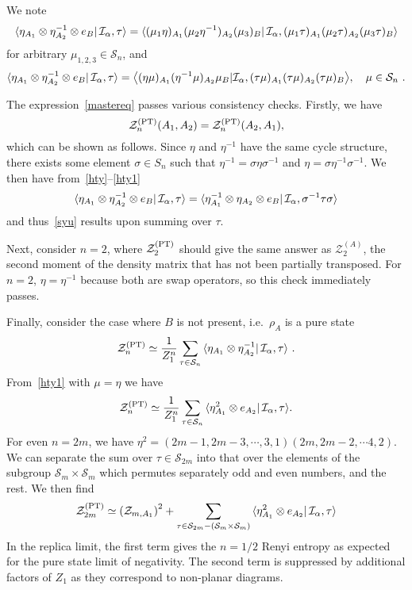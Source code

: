 \documentclass[a4paper,11pt]{article}
\newcommand\vev[1]{{\ensuremath{\left\langle{#1}\right\rangle}}}
\newcommand{\be}{\begin{equation}}
\newcommand{\ee}{\end{equation}}
\newcommand\al{{\alpha}}
\newcommand\sig{\sigma}
\newcommand\sI{{\ensuremath{{\mathcal I}}}}
\newcommand\sS{{\mathcal S}}
\begin{document}
We note 
\be \label{hty}
\bra{\eta_{A_1} \otimes \eta^{-1}_{A_2} \otimes e_{B}}\mathcal{I}_{\alpha},\tau\rangle
= \bra{(\mu_1 \eta)_{A_1} (\mu_2 \eta^{-1})_{A_2} (\mu_3)_{B}}\mathcal{I}_{\alpha},(\mu_1\tau)_{A_1} 
(\mu_2\tau)_{A_2} (\mu_3\tau)_{B} \rangle
\ee
for arbitrary $\mu_{1,2,3} \in \sS_n$, and 
\be \label{hty1}
\bra{\eta_{A_1} \otimes \eta^{-1}_{A_2} \otimes e_{B}}\mathcal{I}_{\alpha},\tau\rangle =
 \vev{(\eta \mu)_{A_1} (\eta^{-1} \mu)_{A_2} \mu_{B} | \sI_\al , (\tau \mu)_{A_1} (\tau \mu)_{A_2} (\tau \mu)_{B} } , \quad \mu \in \sS_n \ .
\ee




The expression~\eqref{mastereq} passes various consistency checks. Firstly, we have 
\be \label{syu}
 \mathcal{Z}_n^{(\rm PT)} (A_1, A_2) = \mathcal{Z}_n^{(\rm PT)} (A_2, A_1) ,
\ee
which can be shown as follows. Since $\eta$ and $\eta^{-1}$ have the same cycle structure, there exists some element $\sig \in S_n$ such that $ \eta^{-1} = \sig \eta \sig^{-1}$ and $\eta = \sig \eta^{-1} \sig^{-1}$. We then have from~\eqref{hty}--\eqref{hty1} 
\be 
\bra{\eta_{A_1} \otimes \eta^{-1}_{A_2} \otimes e_{B}}\mathcal{I}_{\alpha},\tau\rangle =
\bra{\eta^{-1}_{A_1} \otimes \eta_{A_2} \otimes e_{B}}\mathcal{I}_{\alpha}, \sig^{-1} \tau \sig \rangle 
\ee
and thus~\eqref{syu} results upon summing over $\tau$. 

Next, consider $n=2$, where $\mathcal{Z}_2^{(\rm PT)}$ should give the same answer as $\mathcal{Z}^{(A)}_2$, the second moment of the density matrix that has not been partially transposed. For $n = 2$, $\eta = \eta^{-1}$ because both are swap operators, so this check immediately passes.

Finally, consider the case where $B$ is not present, i.e.~$\rho_A$ is a pure state
\begin{align}
 \mathcal{Z}_n^{\rm (PT)}\simeq\frac{1}{Z_1^n} \sum_{ \tau
 \in \sS_n}\bra{\eta_{A_1} \otimes \eta^{-1}_{A_2}}\mathcal{I}_{\alpha},\tau\rangle \ .
\end{align}
From~\eqref{hty1} with $\mu = \eta$ we have 
\begin{align}
 \mathcal{Z}_n^{\rm (PT)}\simeq\frac{1}{Z_1^n} \sum_{ \tau
 \in \sS_n}\bra{\eta^2_{A_1} \otimes e_{A_2}}\mathcal{I}_{\alpha},\tau\rangle.
\end{align}
For even $n = 2m$, we have $\eta^2 = (2m-1, 2m-3, \cdots , 3 ,1) (2m, 2m-2, \cdots 4, 2)$. We can separate the sum over $\tau \in \sS_{2m}$ into that over the elements of the subgroup $\sS_m \times \sS_m$ which permutes separately odd and even numbers, and the rest. We then find 
\begin{align}
 \mathcal{Z}_{2m}^{\rm (PT)}\simeq \left(\mathcal{Z}_{m, A_1}\right)^2 + \sum_{ \tau
 \in \sS_{2m} - (\sS_{m} \times \sS_{m})}\bra{\eta^2_{A_1} \otimes e_{A_2}}\mathcal{I}_{\alpha},\tau\rangle
\end{align}
In the replica limit, the first term gives the $n=1/2$ Renyi entropy as expected for the pure state limit of negativity. The second term is
suppressed by additional factors of $Z_1$ as they correspond to non-planar diagrams.
\end{document}
